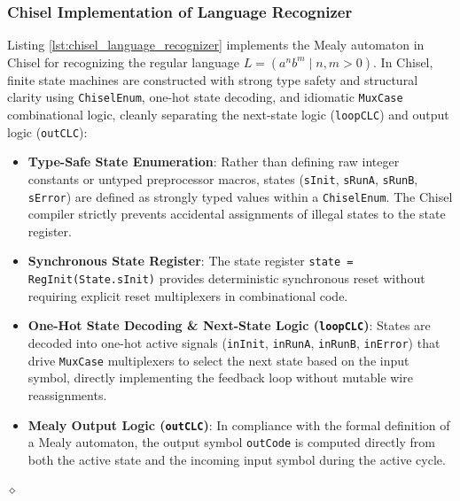\begin{exemplu}
{\subsubsection{Chisel Implementation of Language Recognizer}


Listing \ref{lst:chisel_language_recognizer} implements the Mealy automaton in Chisel for recognizing the regular language $L = (a^n b^m \mid n, m > 0)$. In Chisel, finite state machines are constructed with strong type safety and structural clarity using \texttt{ChiselEnum}, one-hot state decoding, and idiomatic \texttt{MuxCase} combinational logic, cleanly separating the next-state logic (\texttt{loopCLC}) and output logic (\texttt{outCLC}):
\begin{itemize}
    \item \textbf{Type-Safe State Enumeration}: Rather than defining raw integer constants or untyped preprocessor macros, states (\texttt{sInit}, \texttt{sRunA}, \texttt{sRunB}, \texttt{sError}) are defined as strongly typed values within a \texttt{ChiselEnum}. The Chisel compiler strictly prevents accidental assignments of illegal states to the state register.
    \item \textbf{Synchronous State Register}: The state register \texttt{state = RegInit(State.sInit)} provides deterministic synchronous reset without requiring explicit reset multiplexers in combinational code.
    \item \textbf{One-Hot State Decoding \& Next-State Logic (\texttt{loopCLC})}: States are decoded into one-hot active signals (\texttt{inInit}, \texttt{inRunA}, \texttt{inRunB}, \texttt{inError}) that drive \texttt{MuxCase} multiplexers to select the next state based on the input symbol, directly implementing the feedback loop without mutable wire reassignments.
    \item \textbf{Mealy Output Logic (\texttt{outCLC})}: In compliance with the formal definition of a Mealy automaton, the output symbol \texttt{outCode} is computed directly from both the active state and the incoming input symbol during the active cycle.
\end{itemize}
}%

$\diamond$
\end{exemplu}



